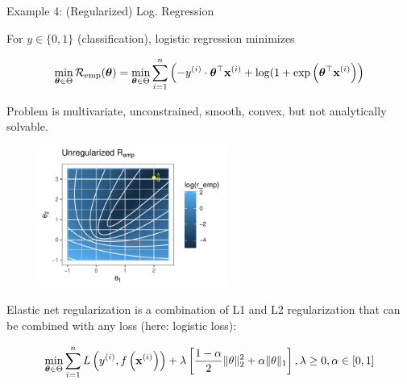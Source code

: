 \documentclass[11pt,compress,t,notes=noshow, xcolor=table]{beamer}
\begin{document}
\begin{vbframe}{Example 4: (Regularized) Log. Regression}

\vspace*{-0.5cm}

For $y \in \{0, 1\}$ (classification), logistic regression minimizes 

\vspace*{-0.5cm}

\begin{eqnarray*}
	\min_{\bm{\theta} \in \Theta} \mathcal{R}_{\text{emp}}(\bm{\theta}) = \min_{\bm{\theta} \in \Theta} \sum\limits_{i=1}^n \left(-y^{(i)} \cdot \bm{\theta}^\top\mathbf{x}^{(i)} + \log(1 + \exp\left(\bm{\theta}^\top\mathbf{x}^{(i)}\right)\right) 
\end{eqnarray*}

Problem is multivariate, unconstrained, smooth, convex, but not analytically solvable. 

\vspace*{-0.3cm}

\begin{figure}
	\includegraphics[width=0.55\textwidth]{figure_man/logreg-0.pdf}
\end{figure}

\framebreak 

\vspace*{-0.8cm}

Elastic net regularization is a combination of L1 and L2 regularization that can be combined with any loss (here: logistic loss): 

\vspace*{-0.3cm}

\begin{footnotesize}
\begin{eqnarray*}
	\min_{\bm{\theta} \in \Theta} \sum\limits_{i=1}^n L\left(y^{(i)}, f\left(\mathbf{x}^{(i)}\right)\right) + \lambda \left[\frac{1-\alpha}{2}\|\theta\|^{2}_{2} + \alpha\|\theta\|_{1}\right], \lambda \geq 0, \alpha \in [0,1]
\end{eqnarray*}
\end{footnotesize}

\vspace*{-1.2cm}


\end{vbframe}
\end{document}
